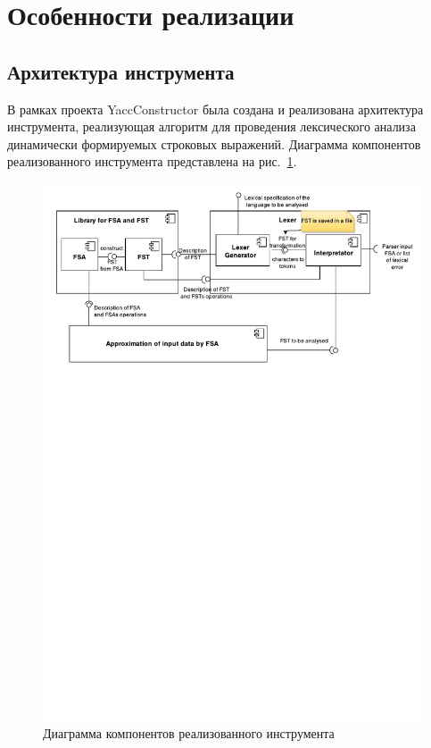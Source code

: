 \section{Особенности реализации}

\subsection{Архитектура инструмента}

В рамках проекта YaccConstructor была создана и реализована архитектура инструмента, реализующая алгоритм для проведения лексического анализа динамически формируемых строковых выражений. Диаграмма компонентов реализованного инструмента представлена на рис.~\ref{fig:CompDiag}.

\begin{figure}[h!]
\begin{center}
\includegraphics[width=1.0\textwidth]{Polubelova/ComponentDiagram}
\caption{Диаграмма компонентов реализованного инструмента}
\label{fig:CompDiag} 
\end{center}
\end{figure}


